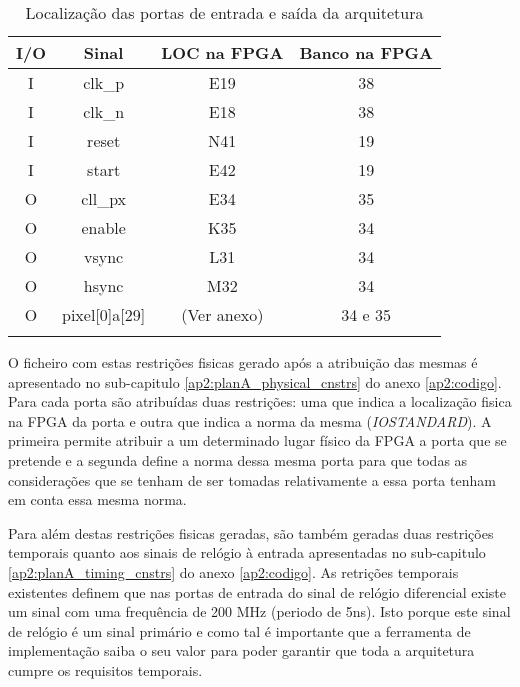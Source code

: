 \begin{longtable}[h!]
	{|c|c|c|c|}
	\hline
	\centering
		\textbf{I/O} & \textbf{Sinal}        & \textbf{LOC na FPGA} & \textbf{Banco na FPGA} \\ \hline  \endhead
		I            & clk\_p                & E19                  & 38                     \\ \hline
		I            & clk\_n                & E18                  & 38                     \\ \hline
		I            & reset                 & N41                  & 19                     \\ \hline
		I            & start                 & E42                  & 19                     \\ \hline
		O            & cll\_px               & E34                  & 35                     \\ \hline
		O            & enable                & K35                  & 34                     \\ \hline
		O            & vsync                 & L31                  & 34                     \\ \hline
		O            & hsync                 & M32                  & 34                     \\ \hline
		O            & pixel{[}0{]}a{[}29{]} & (Ver anexo)          & 34 e 35                \\ \hline
	\caption{Localização das portas de entrada e saída da arquitetura}
	\label{table:LOCplanA_simples}
\end{longtable}

O ficheiro com estas restrições fisicas gerado após a atribuição das mesmas é apresentado no sub-capitulo \ref{ap2:planA_physical_cnstrs} do anexo \ref{ap2:codigo}. Para cada porta são atribuídas duas restrições: uma que indica a localização fisica na FPGA da porta e outra que indica a norma da mesma (\textit{IOSTANDARD}). A primeira permite atribuir a um determinado lugar físico da FPGA a porta que se pretende e a segunda define a norma dessa mesma porta para que todas as considerações que se tenham de ser tomadas relativamente a essa porta tenham em conta essa mesma norma.

Para além destas restrições fisicas geradas, são também geradas duas restrições temporais quanto aos sinais de relógio à entrada apresentadas no sub-capitulo \ref{ap2:planA_timing_cnstrs} do anexo \ref{ap2:codigo}. As retrições temporais existentes definem que nas portas de entrada do sinal de relógio diferencial existe um sinal com uma frequência de 200 MHz (periodo de 5ns). Isto porque este sinal de relógio é um sinal primário e como tal é importante que a ferramenta de implementação saiba o seu valor para poder garantir que toda a arquitetura cumpre os requisitos temporais.

